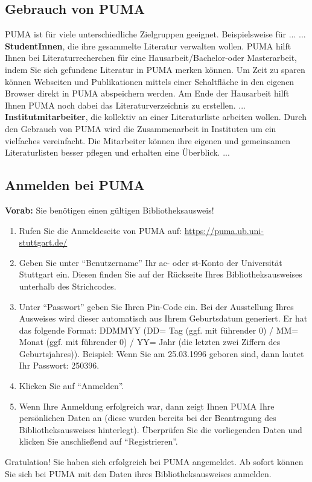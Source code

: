 \documentclass[a4paper,11pt,twoside]{scrbook}
\begin{document}
\subsection{Gebrauch von PUMA}
PUMA ist für viele unterschiedliche Zielgruppen geeignet. Beispielsweise für ...\newline 
... \textbf{StudentInnen}, die ihre gesammelte Literatur verwalten wollen. PUMA hilft Ihnen bei Literaturrecherchen für eine Hausarbeit/Bachelor-oder Masterarbeit, indem Sie sich gefundene Literatur in PUMA merken können. Um Zeit zu sparen können Webseiten und Publikationen mittels einer Schaltfläche in den eigenen Browser direkt in PUMA abspeichern werden. Am Ende der Hausarbeit hilft Ihnen PUMA noch dabei das Literaturverzeichnis zu erstellen.
\newline 
... \textbf{Institutmitarbeiter}, die kollektiv an einer Literaturliste arbeiten wollen. Durch den Gebrauch von PUMA wird die Zusammenarbeit in Instituten um ein vielfaches vereinfacht. Die Mitarbeiter können ihre eigenen und gemeinsamen Literaturlisten besser pflegen und erhalten eine Überblick. \newline ... 
\subsection{Anmelden bei PUMA} 
\textbf{Vorab:} Sie benötigen einen gültigen Bibliotheksausweis!
\begin{enumerate}
    \item Rufen Sie die Anmeldeseite von PUMA auf: \url{https://puma.ub.uni-stuttgart.de/}
    \item Geben Sie unter \enquote{Benutzername} Ihr ac- oder st-Konto der Universität Stuttgart ein. Diesen finden Sie auf der Rückseite Ihres Bibliotheksausweises unterhalb des Strichcodes. %
    \item Unter  \enquote{Passwort} geben Sie Ihren Pin-Code ein. Bei der Ausstellung Ihres Ausweises wird dieser automatisch aus Ihrem Geburtsdatum generiert. Er hat das folgende Format: DDMMYY (DD= Tag (ggf. mit führender 0) / MM= Monat (ggf. mit führender 0) / YY= Jahr (die letzten zwei Ziffern des Geburtsjahres)). Beispiel: Wenn Sie am 25.03.1996 geboren sind, dann lautet Ihr Passwort: 250396.
    \item Klicken Sie auf \enquote{Anmelden}.
    \item Wenn Ihre Anmeldung erfolgreich war, dann zeigt Ihnen PUMA Ihre persönlichen Daten an (diese wurden bereits bei der Beantragung des Bibliotheksausweises hinterlegt). Überprüfen Sie die vorliegenden Daten und klicken Sie anschließend auf \enquote{Registrieren}.
\end{enumerate}
Gratulation! Sie haben sich erfolgreich bei PUMA angemeldet. Ab sofort können Sie sich bei PUMA mit den Daten ihres Bibliotheksausweises anmelden. 
\end{document}
